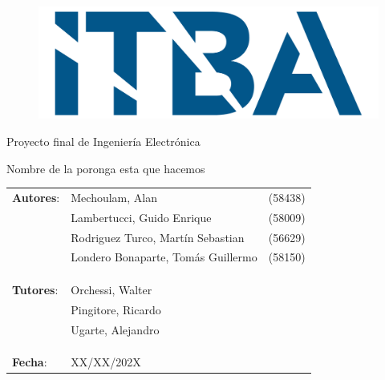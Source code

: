 \begin{titlepage}
\begin{figure}[H]
	\centering
	\includegraphics[width=0.5\linewidth]{./ITBA_2}
\end{figure}

\vspace*{1.5cm}

\center
{\Huge Proyecto final de Ingeniería Electrónica }

\vspace*{1cm}

{\LARGE \textcolor{PName}{Nombre de la poronga esta que hacemos} }

\vspace*{3cm}

\begin{tabular}{llr} 	
\textbf{Autores}: & Mechoulam, Alan  &  (58438)\\
 & Lambertucci, Guido Enrique  & (58009) \\
 & Rodriguez Turco, Martín Sebastian  & (56629) \\
 & Londero Bonaparte, Tomás Guillermo  & (58150) \\
 &  & \\
 &  & \\
 &  & \\
\textbf{Tutores}: & Orchessi, Walter & \hspace*{4cm} \\
 & Pingitore, Ricardo & \hspace*{4cm} \\
 & Ugarte, Alejandro & \hspace*{4cm} \\
 &  & \\
 &  & \\
 &  & \\
\textbf{Fecha}: & XX/XX/202X & \hspace*{4.5cm}\\
\end{tabular}

\end{titlepage}